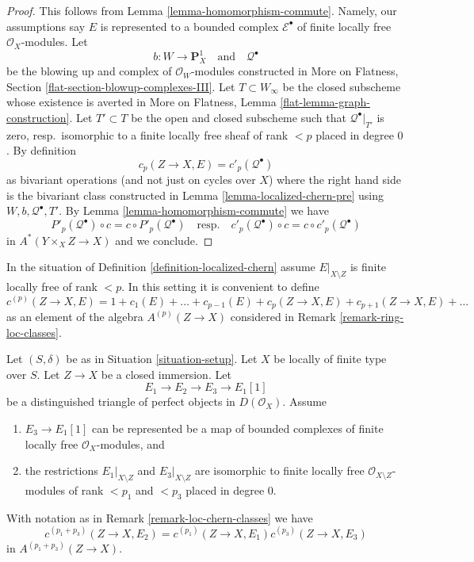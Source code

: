 \begin{proof}
This follows from Lemma \ref{lemma-homomorphism-commute}.
Namely, our assumptions say $E$
is represented to a bounded complex $\mathcal{E}^\bullet$
of finite locally free $\mathcal{O}_X$-modules. Let
$$
b : W \to \mathbf{P}^1_X
\quad\text{and}\quad
\mathcal{Q}^\bullet
$$
be the blowing up and complex of $\mathcal{O}_W$-modules constructed in
More on Flatness, Section \ref{flat-section-blowup-complexes-III}.
Let $T \subset W_\infty$ be the closed subscheme whose existence is
averted in More on Flatness, Lemma \ref{flat-lemma-graph-construction}.
Let $T' \subset T$ be the open and closed subscheme such that
$\mathcal{Q}^\bullet|_{T'}$ is zero, resp.\ isomorphic to a
finite locally free sheaf of rank $< p$ placed in degree $0$. By definition
$$
c_p(Z \to X, E) = c'_p(\mathcal{Q}^\bullet)
$$
as bivariant operations (and not just on cycles over $X$)
where the right hand side is the bivariant class constructed in
Lemma \ref{lemma-localized-chern-pre} using $W, b, \mathcal{Q}^\bullet, T'$.
By Lemma \ref{lemma-homomorphism-commute} we have
$$
P'_p(\mathcal{Q}^\bullet) \circ c = c \circ P'_p(\mathcal{Q}^\bullet)
\quad\text{resp.}\quad
c'_p(\mathcal{Q}^\bullet) \circ c = c \circ c'_p(\mathcal{Q}^\bullet)
$$
in $A^*(Y \times_X Z \to X)$ and we conclude.
\end{proof}

\begin{remark}
\label{remark-loc-chern-classes}
In the situation of Definition \ref{definition-localized-chern}
assume $E|_{X \setminus Z}$ is finite locally free of rank $< p$.
In this setting it is convenient to define
$$
c^{(p)}(Z \to X, E) = 1 + c_1(E) + \ldots + c_{p - 1}(E) +
c_p(Z \to X, E) + c_{p + 1}(Z \to X, E) + \ldots
$$
as an element of the algebra $A^{(p)}(Z \to X)$ considered in
Remark \ref{remark-ring-loc-classes}.
\end{remark}

\begin{lemma}
\label{lemma-additivity-loc-chern-c}
Let $(S, \delta)$ be as in Situation \ref{situation-setup}.
Let $X$ be locally of finite type over $S$. Let $Z \to X$ be
a closed immersion. Let
$$
E_1 \to E_2 \to E_3 \to E_1[1]
$$
be a distinguished triangle of perfect objects in $D(\mathcal{O}_X)$.
Assume
\begin{enumerate}
\item $E_3 \to E_1[1]$ can be represented be a map of bounded complexes
of finite locally free $\mathcal{O}_X$-modules, and
\item the restrictions $E_1|_{X \setminus Z}$ and $E_3|_{X \setminus Z}$
are isomorphic to finite locally free $\mathcal{O}_{X \setminus Z}$-modules
of rank $< p_1$ and $< p_3$ placed in degree $0$.
\end{enumerate}
With notation as in Remark \ref{remark-loc-chern-classes} we have
$$
c^{(p_1 + p_3)}(Z \to X, E_2) = c^{(p_1)}(Z \to X, E_1)c^{(p_3)}(Z \to X, E_3)
$$
in $A^{(p_1 + p_3)}(Z \to X)$.
\end{lemma}

